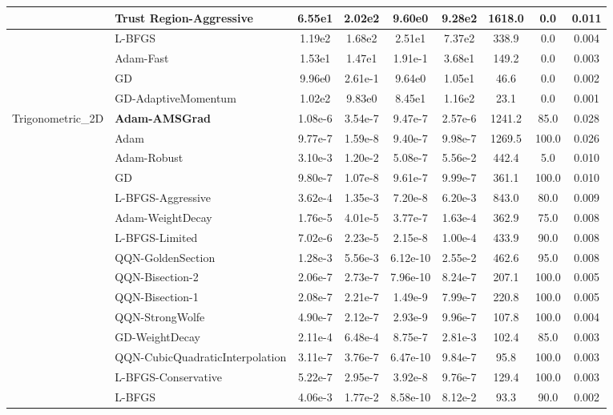 \documentclass{article}
\begin{document}
\begin{longtable}{|l|l|c|c|c|c|c|c|c|}
\hline
 & Trust Region-Aggressive & 6.55e1 & 2.02e2 & 9.60e0 & 9.28e2 & 1618.0 & 0.0 & 0.011 \\
\hline
 & L-BFGS & 1.19e2 & 1.68e2 & 2.51e1 & 7.37e2 & 338.9 & 0.0 & 0.004 \\
\hline
 & Adam-Fast & 1.53e1 & 1.47e1 & 1.91e-1 & 3.68e1 & 149.2 & 0.0 & 0.003 \\
\hline
 & GD & 9.96e0 & 2.61e-1 & 9.64e0 & 1.05e1 & 46.6 & 0.0 & 0.002 \\
\hline
 & GD-AdaptiveMomentum & 1.02e2 & 9.83e0 & 8.45e1 & 1.16e2 & 23.1 & 0.0 & 0.001 \\
Trigonometric\_2D & \textbf{Adam-AMSGrad} & 1.08e-6 & 3.54e-7 & 9.47e-7 & 2.57e-6 & 1241.2 & 85.0 & 0.028 \\
\hline
 & Adam & 9.77e-7 & 1.59e-8 & 9.40e-7 & 9.98e-7 & 1269.5 & 100.0 & 0.026 \\
\hline
 & Adam-Robust & 3.10e-3 & 1.20e-2 & 5.08e-7 & 5.56e-2 & 442.4 & 5.0 & 0.010 \\
\hline
 & GD & 9.80e-7 & 1.07e-8 & 9.61e-7 & 9.99e-7 & 361.1 & 100.0 & 0.010 \\
\hline
 & L-BFGS-Aggressive & 3.62e-4 & 1.35e-3 & 7.20e-8 & 6.20e-3 & 843.0 & 80.0 & 0.009 \\
\hline
 & Adam-WeightDecay & 1.76e-5 & 4.01e-5 & 3.77e-7 & 1.63e-4 & 362.9 & 75.0 & 0.008 \\
\hline
 & L-BFGS-Limited & 7.02e-6 & 2.23e-5 & 2.15e-8 & 1.00e-4 & 433.9 & 90.0 & 0.008 \\
\hline
 & QQN-GoldenSection & 1.28e-3 & 5.56e-3 & 6.12e-10 & 2.55e-2 & 462.6 & 95.0 & 0.008 \\
\hline
 & QQN-Bisection-2 & 2.06e-7 & 2.73e-7 & 7.96e-10 & 8.24e-7 & 207.1 & 100.0 & 0.005 \\
\hline
 & QQN-Bisection-1 & 2.08e-7 & 2.21e-7 & 1.49e-9 & 7.99e-7 & 220.8 & 100.0 & 0.005 \\
\hline
 & QQN-StrongWolfe & 4.90e-7 & 2.12e-7 & 2.93e-9 & 9.96e-7 & 107.8 & 100.0 & 0.004 \\
\hline
 & GD-WeightDecay & 2.11e-4 & 6.48e-4 & 8.75e-7 & 2.81e-3 & 102.4 & 85.0 & 0.003 \\
\hline
 & QQN-CubicQuadraticInterpolation & 3.11e-7 & 3.76e-7 & 6.47e-10 & 9.84e-7 & 95.8 & 100.0 & 0.003 \\
\hline
 & L-BFGS-Conservative & 5.22e-7 & 2.95e-7 & 3.92e-8 & 9.76e-7 & 129.4 & 100.0 & 0.003 \\
\hline
 & L-BFGS & 4.06e-3 & 1.77e-2 & 8.58e-10 & 8.12e-2 & 93.3 & 90.0 & 0.002 \\

\end{longtable}
\end{document}
